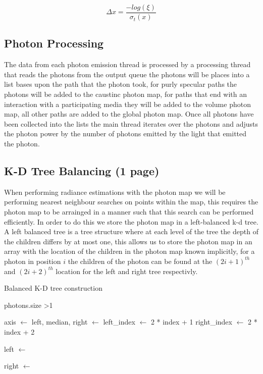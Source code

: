 \begin{equation}
\label{eq:volume_dist_importance}
\Delta x = \frac{-log(\xi)}{\sigma_t(x)}
\end{equation}

\subsection{Photon Processing}
The data from each photon emission thread is processed by a processing thread that reads the photons from the output queue
the photons will be places into a list bases upon the path that the photon took, for purly specular paths the photons
will be added to the caustinc photon map, for paths that end with an interaction with a participating media they will be
added to the volume photon map, all other paths are added to the global photon map. Once all photons have been collected
into the lists the main thread iterates over the photons and adjusts the photon power by the number of photons emitted by
the light that emitted the photon. 

\subsection{K-D Tree Balancing (1 page)}
When performing radiance estimations with the photon map we will be performing nearest neighbour searches on points within
the map, this requires the photon map to be arrainged in a manner such that this search can be performed efficiently.
In order to do this we store the photon map in a left-balanced k-d tree. A left balanced tree is a tree structure where
at each level of the tree the depth of the children differs by at most one,
this allows us to store the photon map in an array with the location of the children in the photon map known implicitly,
for a photon in position $i$ the children of the photon can be found at the $(2i + 1)^{th}$ and $(2i + 2)^{th}$
location for the left and right tree respectivly.

\begin{algorithm}
\begin{algorithmic}
\caption{Balanced K-D tree construction}
\label{alg:balance}
\label{alg:balance}
\If
{
photons.size \textgreater 1
}
{
	\State axis $\gets$ 
	\State left, median, right $\gets$ 
	\State left\_index  $\gets$ 2 * index + 1
	\State right\_index $\gets$ 2 * index + 2

		\State left $\gets$ 
	\EndIf

		\State right $\gets$ 
	\EndIf

}
\Else
{

}
\EndIf
\EndFunction

\end{algorithmic}
\end{algorithm}

